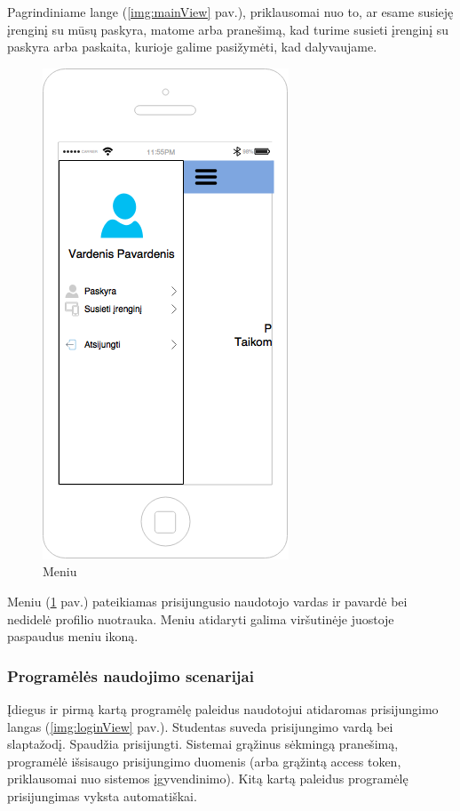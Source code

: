 \documentclass{VUMIFPSkursinis}
\begin{document}
Pagrindiniame lange (\ref{img:mainView} pav.), priklausomai nuo to, ar esame susieję įrenginį su mūsų paskyra, matome arba pranešimą, kad turime susieti įrenginį su paskyra arba paskaita, kurioje galime pasižymėti, kad dalyvaujame.

\begin{figure}[H]
	\centering
	\includegraphics[scale=0.5]{img/kursinio_app_menu}
	\caption{Meniu}
	\label{img:menuView}
\end{figure}

Meniu (\ref{img:menuView} pav.) pateikiamas prisijungusio naudotojo vardas ir pavardė bei nedidelė profilio nuotrauka. Meniu atidaryti galima viršutinėje juostoje paspaudus meniu ikoną.

\subsubsection{Programėlės naudojimo scenarijai}


Įdiegus ir pirmą kartą programėlę paleidus naudotojui atidaromas prisijungimo langas (\ref{img:loginView} pav.). Studentas suveda prisijungimo vardą bei slaptažodį. Spaudžia prisijungti. Sistemai grąžinus sėkmingą pranešimą, programėlė išsisaugo prisijungimo duomenis (arba grąžintą access token, priklausomai nuo sistemos įgyvendinimo). Kitą kartą paleidus programėlę prisijungimas vyksta automatiškai.
\end{document}
